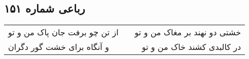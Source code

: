 \begin{center}
\section*{رباعی شماره ۱۵۱}
\label{sec:sh151}
\begin{longtable}{l p{0.5cm} r}
از تن چو برفت جان پاک من و تو
&&
خشتی دو نهند بر مغاک من و تو
\\
و آنگاه برای خشت گور دگران
&&
در کالبدی کشند خاک من و تو
\\
\end{longtable}
\end{center}
